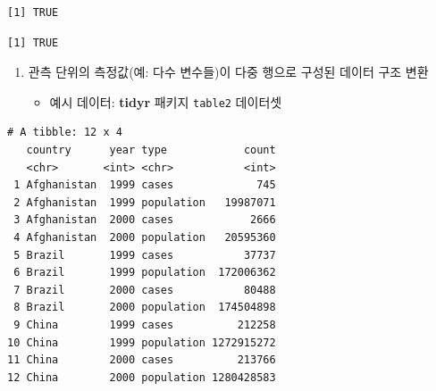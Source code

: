 \documentclass[
  11pt,
]{krantz}
\newenvironment{Shaded}{\begin{snugshade}}{\end{snugshade}}
\newcommand{\CommentTok}[1]{\textcolor[rgb]{0.37,0.37,0.37}{\textit{#1}}}
\newcommand{\DecValTok}[1]{\textcolor[rgb]{0.06,0.06,0.06}{#1}}
\newcommand{\KeywordTok}[1]{\textcolor[rgb]{0.27,0.27,0.27}{\textbf{#1}}}
\newcommand{\NormalTok}[1]{#1}
\newcommand{\OperatorTok}[1]{\textcolor[rgb]{0.43,0.43,0.43}{\textbf{#1}}}
\newcommand{\StringTok}[1]{\textcolor[rgb]{0.5,0.5,0.5}{#1}}
\providecommand{\tightlist}{%
  \setlength{\itemsep}{0pt}\setlength{\parskip}{0pt}}
\begin{document}
\begin{verbatim}
[1] TRUE
\end{verbatim}

\begin{Shaded}
\end{Shaded}

\begin{verbatim}
[1] TRUE
\end{verbatim}

\normalsize

\begin{enumerate}
\def\labelenumi{\arabic{enumi}.}
\setcounter{enumi}{1}
\tightlist
\item
  관측 단위의 측정값(예: 다수 변수들)이 다중 행으로 구성된 데이터 구조 변환

  \begin{itemize}
  \tightlist
  \item
    예시 데이터: \textbf{tidyr} 패키지 \texttt{table2} 데이터셋
  \end{itemize}
\end{enumerate}

\footnotesize

\begin{Shaded}
\end{Shaded}

\begin{verbatim}
# A tibble: 12 x 4
   country      year type            count
   <chr>       <int> <chr>           <int>
 1 Afghanistan  1999 cases             745
 2 Afghanistan  1999 population   19987071
 3 Afghanistan  2000 cases            2666
 4 Afghanistan  2000 population   20595360
 5 Brazil       1999 cases           37737
 6 Brazil       1999 population  172006362
 7 Brazil       2000 cases           80488
 8 Brazil       2000 population  174504898
 9 China        1999 cases          212258
10 China        1999 population 1272915272
11 China        2000 cases          213766
12 China        2000 population 1280428583
\end{verbatim}
\end{document}
